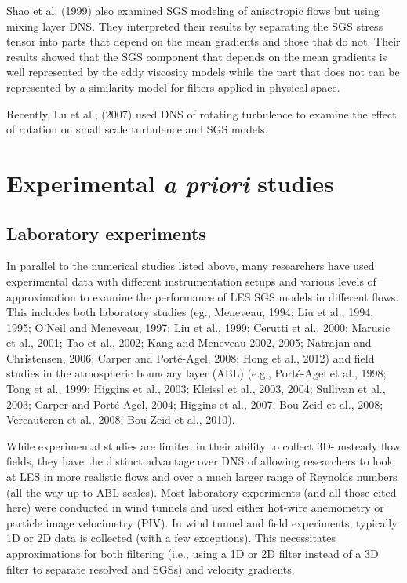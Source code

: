 \documentclass[11pt]{article}
\begin{document}
Shao et al. (1999) also examined SGS modeling of anisotropic flows but using mixing layer DNS.  They interpreted their results by separating the SGS stress tensor into parts that depend on the mean gradients and those that do not.  Their results showed that the SGS component that depends on the mean gradients is well represented by the eddy viscosity models while the part that does not can be represented by a similarity model for filters applied in physical space. 

Recently, Lu et al., (2007) used DNS of rotating turbulence to examine the effect of rotation on small scale turbulence and SGS models.

\section*{Experimental {\it a priori} studies}

\subsection*{Laboratory experiments}

In parallel to the numerical studies listed above, many researchers have used experimental data with different instrumentation setups and various levels of approximation to examine the performance of LES SGS models in different flows. This includes both laboratory studies (eg., Meneveau, 1994; Liu et al., 1994, 1995; O'Neil and Meneveau, 1997; Liu et al., 1999; Cerutti et al., 2000; Marusic et al., 2001; Tao et al., 2002; Kang and Meneveau 2002, 2005; Natrajan and Christensen, 2006; Carper and Port\'e-Agel, 2008; Hong et al., 2012) and field studies in the atmospheric boundary layer (ABL) (e.g., Port\'e-Agel et al., 1998; Tong et al., 1999; Higgins et al., 2003; Kleissl et al., 2003, 2004; Sullivan et al., 2003; Carper and Port\'e-Agel, 2004; Higgins et al., 2007; Bou-Zeid et al., 2008; Vercauteren et al., 2008; Bou-Zeid et al., 2010). 

While experimental studies are limited in their ability to collect 3D-unsteady flow fields, they have the distinct advantage over DNS of allowing researchers to look at LES in more realistic flows and over a much larger range of Reynolds numbers (all the way up to ABL scales).  Most laboratory experiments (and all those cited here) were conducted in wind tunnels and used either hot-wire anemometry or particle image velocimetry (PIV). In wind tunnel and field experiments, typically 1D or 2D data is collected (with a few exceptions). This necessitates approximations for both filtering (i.e., using a 1D or 2D filter instead of a 3D filter to separate resolved and SGSs) and velocity gradients. 
\end{document}
